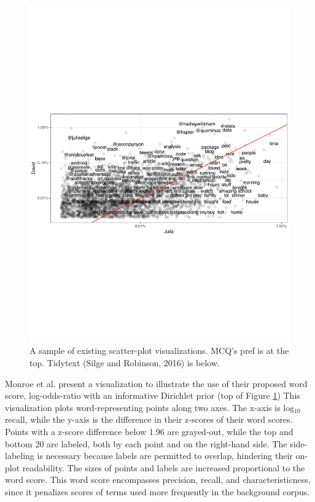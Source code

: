 \documentclass[11pt,a4paper]{article}
\begin{document}
\begin{figure}[h]
\includegraphics[width=\columnwidth]{tidytext}
\vspace{-0.8cm}
\caption{A sample of existing scatter-plot visualizations. MCQ's pref is at the top. Tidytext (Silge and Robinson, 2016) is below.} 
\vspace{-0.5cm}
\label{scatters}
\end{figure}

Monroe et al.  present a visualization to illustrate the use of their proposed word score, log-odds-ratio with an informative Dirichlet prior (top of Figure \ref{scatters})  This visualization plots word-representing points along two axes.  The x-axis is log$_{10}$ recall, while the y-axis is the difference in their z-scores of their word scores.  Points with a z-score difference below 1.96 are grayed-out, while the top and bottom 20 are labeled, both by each point and on the right-hand side.  The side-labeling is necessary because labels are permitted to overlap, hindering their on-plot readability.  The sizes of points and labels are increased  proportional to the word score. This word score encompasses precision, recall, and characteristicness, since it penalizes scores of terms used more frequently in the background corpus. 
\end{document}
